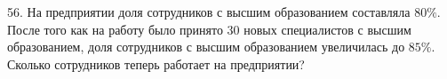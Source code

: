 56. На предприятии доля сотрудников с высшим образованием составляла $80\%.$ После того как на работу было принято 30 новых специалистов с высшим образованием, доля сотрудников с высшим образованием увеличилась до $85\%.$ Сколько сотрудников теперь работает на предприятии?\\
